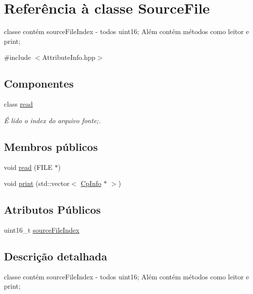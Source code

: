 \hypertarget{class_source_file}{}\section{Referência à classe Source\+File}
\label{class_source_file}


classe contém source\+File\+Index -\/ todos uint16; Além contém métodos como leitor e print;  




{\ttfamily \#include $<$Attribute\+Info.\+hpp$>$}

\subsection*{Componentes}
\begin{DoxyCompactItemize}
\item 
class \hyperlink{class_source_file_1_1read}{read}
\begin{DoxyCompactList}\small\item\em É lido o index do arquivo fonte;. \end{DoxyCompactList}\end{DoxyCompactItemize}
\subsection*{Membros públicos}
\begin{DoxyCompactItemize}
\item 
void \hyperlink{class_source_file_ab03dce42dd5c3f890ac4efa38e9d93e6}{read} (F\+I\+LE $\ast$)
\item 
void \hyperlink{class_source_file_ab60e06ebfcc9d1c9d0dda817cca0fc10}{print} (std\+::vector$<$ \hyperlink{class_cp_info}{Cp\+Info} $\ast$ $>$)
\end{DoxyCompactItemize}
\subsection*{Atributos Públicos}
\begin{DoxyCompactItemize}
\item 
uint16\+\_\+t \hyperlink{class_source_file_a3786d0b21d98b8fe5cd7ca9840a12975}{source\+File\+Index}
\end{DoxyCompactItemize}


\subsection{Descrição detalhada}
classe contém source\+File\+Index -\/ todos uint16; Além contém métodos como leitor e print; 

